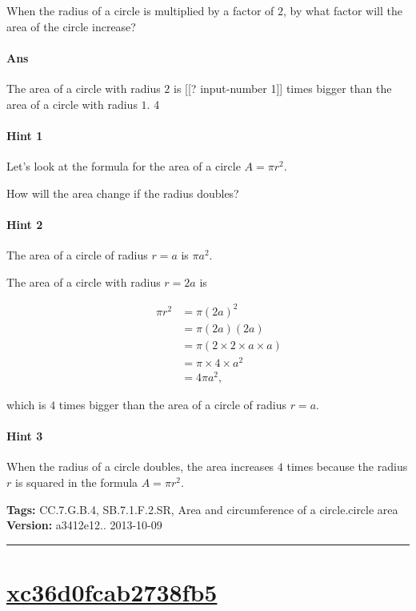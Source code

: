 \documentclass[twocolumn,10pt]{article}
\begin{document}
\noindent
When the radius of a circle is multiplied by a factor of $2$, by what factor will the area of the circle increase?

\paragraph{Ans} The area of a circle with radius $2$ is [[? input-number 1]] times bigger than the area of a circle with radius $1$.  4

\paragraph{Hint 1}Let's look at the formula for the area of a circle $A=\pi r^2$. 

How will the area change if the radius doubles?

\paragraph{Hint 2}The area of a circle of radius $r=a$ is $\pi a^2$.

The area of a circle with radius $r=2a$ is 

\begin{align*}
\qquad  \pi r^2 & =\pi (2a)^2  \\
  & =\pi(2a)(2a) \\
  &=\pi(2 \times 2 \times a \times a)  \\
   &= \pi \times 4 \times a^2 \\
   &= 4\pi a^2,
\end{align*} 

which is $4$ times bigger than the area of a circle of radius $r=a$. 

\paragraph{Hint 3}When the radius of a circle doubles, the area increases $4$ times because the radius $r$ is squared in the formula $A=\pi r^2$.




\medskip
\noindent
\textbf{Tags:} {\footnotesize CC.7.G.B.4, SB.7.1.F.2.SR, Area and circumference of a circle.circle area}\\
\textbf{Version:} a3412e12.. 2013-10-09
\smallskip\hrule





\section{\href{https://www.khanacademy.org/devadmin/content/items/xc36d0fcab2738fb5}{xc36d0fcab2738fb5}}
\end{document}
